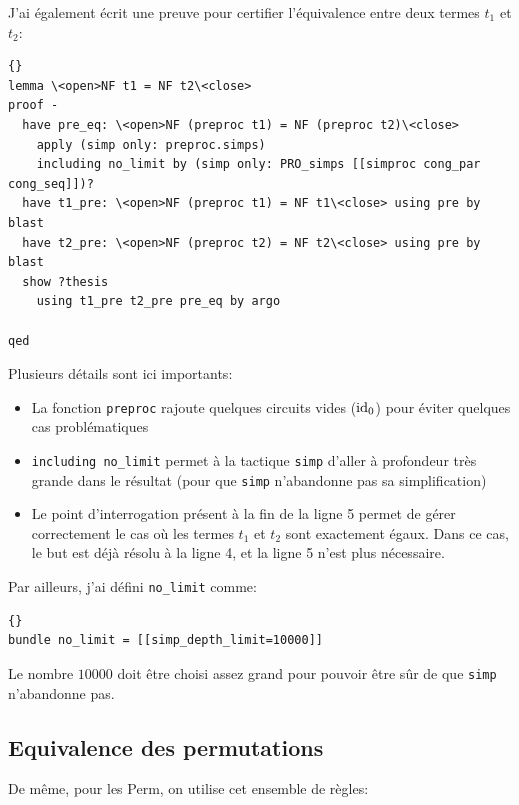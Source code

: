 \documentclass[12pt, a4paper]{article}
\begin{document}
J'ai également écrit une preuve pour certifier l'équivalence entre deux termes $t_1$ et $t_2$:

\begin{lstlisting}[language=Isar]{}
lemma \<open>NF t1 = NF t2\<close>
proof -
  have pre_eq: \<open>NF (preproc t1) = NF (preproc t2)\<close>
    apply (simp only: preproc.simps)
    including no_limit by (simp only: PRO_simps [[simproc cong_par cong_seq]])?
  have t1_pre: \<open>NF (preproc t1) = NF t1\<close> using pre by blast
  have t2_pre: \<open>NF (preproc t2) = NF t2\<close> using pre by blast
  show ?thesis
    using t1_pre t2_pre pre_eq by argo

qed
\end{lstlisting}

Plusieurs détails sont ici importants:

\begin{itemize}
    \item La fonction \lstinline[language=Isar]|preproc| rajoute quelques circuits vides ($\textup{id}_0$) pour éviter quelques cas problématiques
    \item \lstinline[language=Isar]|including no_limit| permet à la tactique \lstinline[language=Isar]|simp| d'aller à profondeur très grande dans le résultat (pour que \lstinline[language=Isar]|simp| n'abandonne pas sa simplification)
    \item Le point d'interrogation présent à la fin de la ligne 5 permet de gérer correctement le cas où les termes $t_1$ et $t_2$ sont exactement égaux. Dans ce cas, le but est déjà résolu à la ligne 4, et la ligne 5 n'est plus nécessaire.
\end{itemize}

Par ailleurs, j'ai défini \lstinline[language=Isar]|no_limit| comme:

\begin{lstlisting}[language=Isar]{}
bundle no_limit = [[simp_depth_limit=10000]]
\end{lstlisting}

Le nombre $10000$ doit être choisi assez grand pour pouvoir être sûr de que \lstinline[language=Isar]|simp| n'abandonne pas.

\subsection{Equivalence des permutations}

De même, pour les Perm, on utilise cet ensemble de règles:
\end{document}
